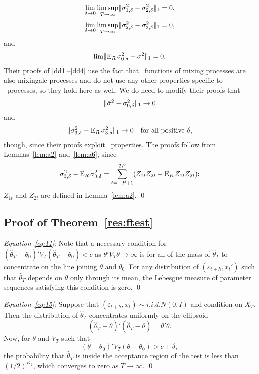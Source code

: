 \documentclass[11pt]{article}
\newcommand{\e}{\varepsilon}
\begin{document}
\begin{equation} \label{dd2}
\lim_{\delta\to0} \limsup_{T\to\infty} \lVert \sigma_{1,\delta}^2 - \sigma_{2,\delta}^{2}
\rVert_1 = 0,
\end{equation}
\begin{equation} \label{dd3}
\lim_{\delta\to0} \limsup_{T\to\infty} \lVert \sigma_{2,\delta}^{2} - \sigma_{3,\delta}^{2}
\rVert_1 = 0,
\end{equation}
and
\begin{equation} \label{dd4}
\lim \lVert \operatorname{E}_R \sigma_{0,\delta}^2 - \sigma^2 \rVert_1 = 0.
\end{equation}
Their proofs of \eqref{dd1}--\eqref{dd4} use the fact that \ned\
functions of mixing processes are also mixingale processes and do not
use any other properties specific to \ned\ processes, so they hold
here as well.  We do need to modify their proofs that
\begin{equation}
  \label{eq:4} \lVert \hat{\sigma}^2 - \sigma_{0,\delta}^2 \rVert_1 \to 0
\end{equation}
and
\begin{equation}
  \label{eq:5} \lVert \sigma_{3,\delta}^{2} - \operatorname{E}_R \sigma_{3,\delta}^{2} \rVert_1
  \to 0 \quad \text{for all positive $\delta$},
\end{equation}
though, since their proofs exploit \ned\ properties.  The proofs
follow from Lemmas~\ref{lem:a2} and~\ref{lem:a6}, since
\begin{equation*}
  \sigma_{3,\delta}^{2} - \operatorname{E}_R \sigma_{3,\delta}^{2} = \sum_{t=-P+1}^{2P} (Z_{1t}Z_{2t} - \operatorname{E}_R Z_{1t}Z_{2t});
\end{equation*}
$Z_{1t}$ and $Z_{2t}$ are defined in Lemma~\ref{lem:a2}.
\qed

\subsection*{Proof of Theorem~\ref{res:ftest}}

\textit{Equation~\eqref{eq:11}}: Note that a necessary condition for
$(\hat{\theta}_T - \theta_0)'V_T (\hat{\theta}_T - \theta_0) < c$
as $\theta'V_T\theta \to \infty$ is for all of the mass of
$\hat{\theta}_T$ to concentrate on the line joining $\theta$ and
$\theta_0$.  For any distribution of $(\e_{t+h}, x_t')$ such
that $\hat{\theta}_T$ depends on $\theta$ only through its mean, the
Lebesgue measure of parameter sequences satisfying this condition is
zero. \qed

\vspace{\baselineskip}
\noindent\textit{Equation~\eqref{eq:15}}:  Suppose that
$(\e_{t+h}, x_t) \sim i.i.d. N(0,I)$ and condition on $X_T$.
Then the distribution of $\hat{\theta}_{T}$ concentrates uniformly on
the ellipsoid
\begin{equation*}
  (\hat{\theta}_T - \theta)'(\hat{\theta}_T - \theta) = \theta'\theta.
\end{equation*}
Now, for $\theta$ and $V_T$ such that
\begin{equation*}
  (\theta-\theta_0)' V_T (\theta-\theta_0) > c + \delta,
\end{equation*}
the probability that $\hat{\theta}_T$ is inside the acceptance region
of the test is less than $(1/2)^{K_2}$, which converges to zero as $T
\to \infty$. \qed
\end{document}
